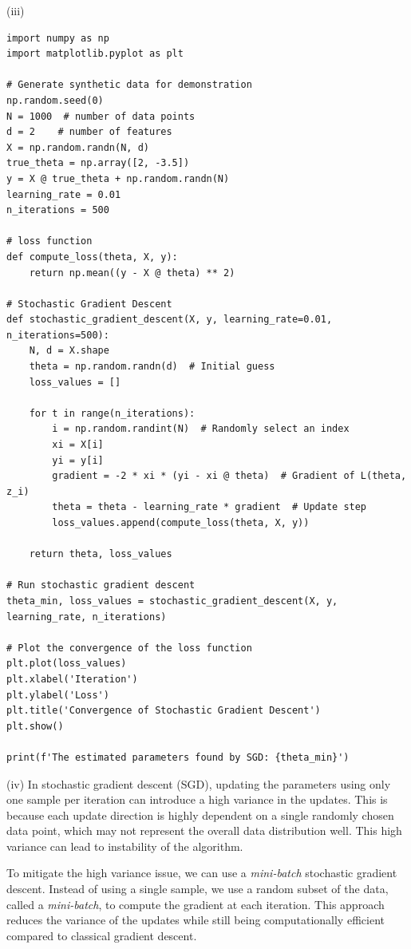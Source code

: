 \documentclass[letter,11pt]{article}
\begin{document}
    (iii) \begin{lstlisting}
import numpy as np
import matplotlib.pyplot as plt

# Generate synthetic data for demonstration
np.random.seed(0)
N = 1000  # number of data points
d = 2    # number of features
X = np.random.randn(N, d)
true_theta = np.array([2, -3.5])
y = X @ true_theta + np.random.randn(N) 
learning_rate = 0.01
n_iterations = 500

# loss function
def compute_loss(theta, X, y):
    return np.mean((y - X @ theta) ** 2)

# Stochastic Gradient Descent 
def stochastic_gradient_descent(X, y, learning_rate=0.01, n_iterations=500):
    N, d = X.shape
    theta = np.random.randn(d)  # Initial guess 
    loss_values = []

    for t in range(n_iterations):
        i = np.random.randint(N)  # Randomly select an index 
        xi = X[i]
        yi = y[i]
        gradient = -2 * xi * (yi - xi @ theta)  # Gradient of L(theta, z_i)
        theta = theta - learning_rate * gradient  # Update step
        loss_values.append(compute_loss(theta, X, y))

    return theta, loss_values

# Run stochastic gradient descent
theta_min, loss_values = stochastic_gradient_descent(X, y, learning_rate, n_iterations)

# Plot the convergence of the loss function
plt.plot(loss_values)
plt.xlabel('Iteration')
plt.ylabel('Loss')
plt.title('Convergence of Stochastic Gradient Descent')
plt.show()

print(f'The estimated parameters found by SGD: {theta_min}')
    \end{lstlisting}


    (iv) In stochastic gradient descent (SGD), updating the parameters using only one sample per iteration can introduce a high variance in the updates. This is because each update direction is highly dependent on a single randomly chosen data point, which may not represent the overall data distribution well. This high variance can lead to instability of the algorithm. 

To mitigate the high variance issue, we can use a  \textit{mini-batch} stochastic gradient descent. Instead of using a single sample, we use a random subset of the data, called a \textit{mini-batch}, to compute the gradient at each iteration. This approach reduces the variance of the updates while still being computationally efficient compared to classical gradient descent.
\end{document}
